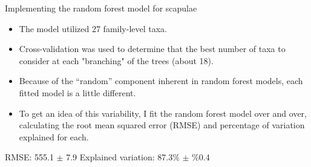 \documentclass{beamer}
\begin{document}
\begin{frame}{Implementing the random forest model for scapulae}

  \begin{itemize}
  \item The model utilized 27 family-level taxa.
  \item Cross-validation was used to determine that the best number of
    taxa to consider at each "branching" of the trees (about 18).
  \end{itemize}

  \vspace{0.1in}

  \begin{itemize}
  \item Because of the ``random'' component inherent in random forest
    models, each fitted model is a little different.
  \item To get an idea of this variability, I fit the random forest
    model over and over, calculating the root mean squared error
    (RMSE) and percentage of variation explained for each.
  \end{itemize}

  \vspace{0.1in}
  
  \noindent RMSE: 555.1  $\pm$ 7.9 \hspace{0.2in}  Explained variation: 87.3\% $\pm$ \%0.4

\end{frame}
\end{document}

